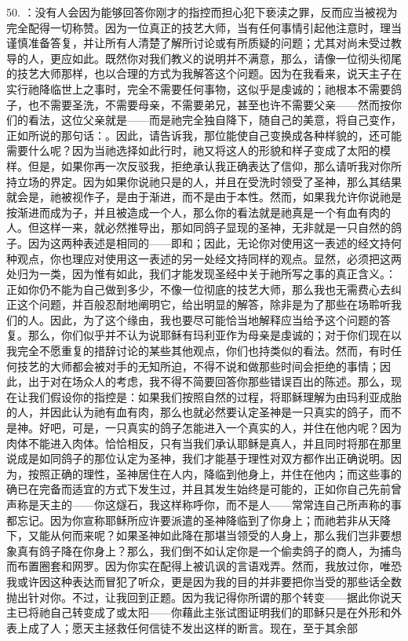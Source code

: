50. ：没有人会因为能够回答你刚才的指控而担心犯下亵渎之罪，反而应当被视为完全配得一切称赞。因为一位真正的技艺大师，当有任何事情引起他注意时，理当谨慎准备答复，并让所有人清楚了解所讨论或有所质疑的问题；尤其对尚未受过教导的人，更应如此。既然你对我们教义的说明并不满意，那么，请像一位彻头彻尾的技艺大师那样，也以合理的方式为我解答这个问题。因为在我看来，说天主子在实行祂降临世上之事时，完全不需要任何事物，这似乎是虔诚的；祂根本不需要鸽子，也不需要圣洗，不需要母亲，不需要弟兄，甚至也许不需要父亲——然而按你们的看法，这位父亲就是——而是祂完全独自降下，随自己的美意，将自己变作，正如所说的那句话：。因此，请告诉我，那位能使自己变换成各种样貌的，还可能需要什么呢？因为当祂选择如此行时，祂又将这人的形貌和样子变成了太阳的模样。但是，如果你再一次反驳我，拒绝承认我正确表达了信仰，那么请听我对你所持立场的界定。因为如果你说祂只是的人，并且在受洗时领受了圣神，那么其结果就会是，祂被视作子，是由于渐进，而不是由于本性。然而，如果我允许你说祂是按渐进而成为子，并且被造成一个人，那么你的看法就是祂真是一个有血有肉的人。但这样一来，就必然推导出，那如同鸽子显现的圣神，无非就是一只自然的鸽子。因为这两种表述是相同的——即和；因此，无论你对使用这一表述的经文持何种观点，你也理应对使用这一表述的另一处经文持同样的观点。显然，必须把这两处归为一类，因为惟有如此，我们才能发现圣经中关于祂所写之事的真正含义。：正如你仍不能为自己做到多少，不像一位彻底的技艺大师，那么我也无需费心去纠正这个问题，并百般忍耐地阐明它，给出明显的解答，除非是为了那些在场聆听我们的人。因此，为了这个缘由，我也要尽可能恰当地解释应当给予这个问题的答复。那么，你们似乎并不认为说耶稣有玛利亚作为母亲是虔诚的；对于你们现在以我完全不愿重复的措辞讨论的某些其他观点，你们也持类似的看法。然而，有时任何技艺的大师都会被对手的无知所迫，不得不说和做那些时间会拒绝的事情；因此，出于对在场众人的考虑，我不得不简要回答你那些错误百出的陈述。那么，现在让我们假设你的指控是：如果我们按照自然的过程，将耶稣理解为由玛利亚成胎的人，并因此认为祂有血有肉，那么也就必然要认定圣神是一只真实的鸽子，而不是神。好吧，可是，一只真实的鸽子怎能进入一个真实的人，并住在他内呢？因为肉体不能进入肉体。恰恰相反，只有当我们承认耶稣是真人，并且同时将那在那里说成是如同鸽子的那位认定为圣神，我们才能基于理性对双方都作出正确说明。因为，按照正确的理性，圣神居住在人内，降临到他身上，并住在他内；而这些事的确已在完备而适宜的方式下发生过，并且其发生始终是可能的，正如你自己先前曾声称是天主的——你这燧石，我这样称呼你，而不是人——常常连自己所声称的事都忘记。因为你宣称耶稣所应许要派遣的圣神降临到了你身上；而祂若非从天降下，又能从何而来呢？如果圣神如此降在那堪当领受的人身上，那么我们岂非要想象真有鸽子降在你身上？那么，我们倒不如认定你是一个偷卖鸽子的商人，为捕鸟而布置圈套和网罗。因为你实在配得上被讥讽的言语戏弄。然而，我放过你，唯恐我或许因这种表达而冒犯了听众，更是因为我的目的并非要把你当受的那些话全数抛出针对你。不过，让我回到正题。因为我记得你所谓的那个转变——据此你说天主已将祂自己转变成了或太阳——你藉此主张试图证明我们的耶稣只是在外形和外表上成了人；愿天主拯救任何信徒不发出这样的断言。现在，至于其余部